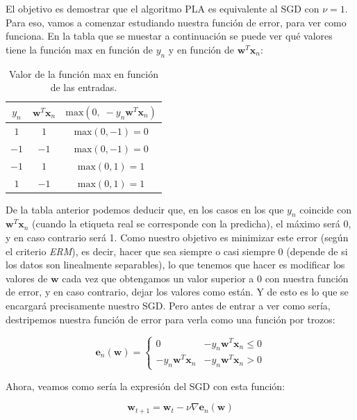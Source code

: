 \documentclass[11pt,a4paper]{article}
\newcommand{\maximum}{\text{max}}
\begin{document}
El objetivo es demostrar que el algoritmo PLA es equivalente al SGD con $\nu = 1$. Para eso, vamos a comenzar estudiando
nuestra función de error, para ver como funciona. En la tabla que se muestar a continuación se puede ver qué valores
tiene la función $\maximum$ en función de $y_n$ y en función de $\mathbf{w}^T\mathbf{x}_n$:

\begin{table}[H]
\centering
\begin{tabular}{c|c|c}
	$y_n$ & $\mathbf{w}^T\mathbf{x}_n$ & $\maximum(0, \; -y_n\mathbf{w}^T\mathbf{x}_n)$ \\ \hline
	$1$  & $1$		   & $\maximum(0, -1) = 0$ \\
	$-1$ & $-1$        & $\maximum(0, -1) = 0$  \\
	$-1$ & $1$         & $\maximum(0, 1) = 1$   \\
	$1$  & $-1$        & $\maximum(0, 1) = 1$                  
\end{tabular}
\caption{Valor de la función max en función de las entradas.}
\end{table}

De la tabla anterior podemos deducir que, en los casos en los que $y_n$ coincide con $\mathbf{w}^T\mathbf{x}_n$ (cuando la
etiqueta real se corresponde con la predicha), el máximo será 0, y en caso contrario será 1. Como nuestro objetivo es
minimizar este error (según el criterio \textit{ERM}), es decir, hacer que sea siempre o casi siempre 0 (depende de si los datos son
linealmente separables), lo que tenemos que hacer es modificar los valores de $\mathbf{w}$ cada vez que obtengamos un valor
superior a 0 con nuestra función de error, y en caso contrario, dejar los valores como están. Y de esto es lo que se encargará
precisamente nuestro SGD. Pero antes de entrar a ver como sería, destripemos nuestra función de error para verla como una
función por trozos:

\begin{equation}
\mathbf{e}_n(\mathbf{w}) = 
\begin{cases}
	0 & -y_n\mathbf{w}^T\mathbf{x}_n \leq 0 \\
	-y_n\mathbf{w}^T\mathbf{x}_n & -y_n\mathbf{w}^T\mathbf{x}_n > 0
\end{cases}
\end{equation}

Ahora, veamos como sería la expresión del SGD con esta función:

\begin{equation}
	\mathbf{w}_{t+1} = \mathbf{w}_{t} - \nu \nabla \mathbf{e}_n(\mathbf{w})
\end{equation}
\end{document}
